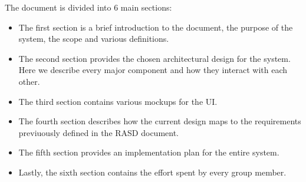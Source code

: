 The document is divided into 6 main sections:
\begin{itemize}
    \item The first section is a brief introduction to the document, the purpose of the system, the scope and various definitions.
    \item The second section provides the chosen architectural design for the system. Here we describe every major component and how they interact with each other.
    \item The third section contains various mockups for the \ac{UI}.
    \item The fourth section describes how the current design maps to the requirements previuously defined in the RASD document.
    \item The fifth section provides an implementation plan for the entire system.
    \item Lastly, the sixth section contains the effort spent by every group member.
\end{itemize}